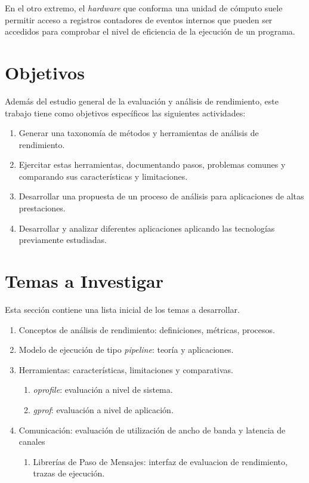 \documentclass[a4paper,twocolumn]{article}
\begin{document}
\smallskip

En el otro extremo, el {\it hardware} que conforma una unidad de c\'omputo suele permitir
acceso a registros contadores de eventos internos que pueden ser accedidos para comprobar el
nivel de eficiencia de la ejecuci\'on de un programa.

\section{Objetivos}

Adem\'as del estudio general de la evaluaci\'on y an\'alisis de rendimiento, este trabajo tiene como
objetivos espec\'ificos las siguientes actividades:

\begin{enumerate}
\item Generar una taxonom\'ia de m\'etodos y herramientas de an\'alisis de rendimiento.
\item Ejercitar estas herramientas, documentando pasos, problemas comunes y comparando sus caracter\'isticas y limitaciones.
\item Desarrollar una propuesta de un proceso de an\'alisis para aplicaciones de altas prestaciones.
\item Desarrollar y analizar diferentes aplicaciones aplicando las tecnolog\'ias previamente estudiadas.
\end{enumerate}

\section{Temas a Investigar}

Esta secci\'on contiene una lista inicial de los temas a desarrollar.

\begin{enumerate}
\item Conceptos de an\'alisis de rendimiento: definiciones, m\'etricas, procesos.
\item Modelo de ejecuci\'on de tipo {\it pipeline}: teor\'ia y aplicaciones.
\item Herramientas: caracter\'isticas, limitaciones y comparativas.
\begin{enumerate}
\item {\it oprofile}: evaluaci\'on a nivel de sistema.
\item {\it gprof}: evaluaci\'on a nivel de aplicaci\'on.
\end{enumerate}
\item Comunicaci\'on:  evaluaci\'on de utilizaci\'on de ancho de banda y latencia de canales
\begin{enumerate}
\item Librer\'ias de Paso de Mensajes: interfaz de evaluacion de rendimiento, trazas de ejecuci\'on.
\end{enumerate}
\end{enumerate}
\end{document}
